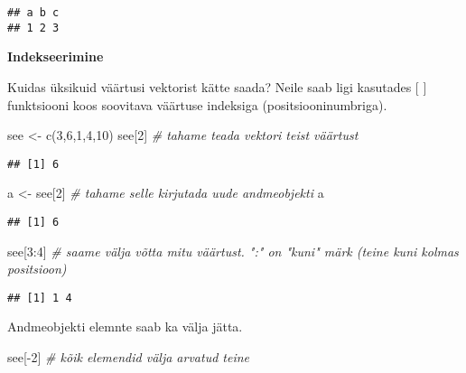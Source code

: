 \documentclass[
]{book}
\newenvironment{Shaded}{\begin{snugshade}}{\end{snugshade}}
\newcommand{\CommentTok}[1]{\textcolor[rgb]{0.56,0.35,0.01}{\textit{#1}}}
\newcommand{\DecValTok}[1]{\textcolor[rgb]{0.00,0.00,0.81}{#1}}
\newcommand{\FunctionTok}[1]{\textcolor[rgb]{0.00,0.00,0.00}{#1}}
\newcommand{\NormalTok}[1]{#1}
\newcommand{\OtherTok}[1]{\textcolor[rgb]{0.56,0.35,0.01}{#1}}
\newcommand{\SpecialCharTok}[1]{\textcolor[rgb]{0.00,0.00,0.00}{#1}}
\begin{document}
\begin{verbatim}
## a b c 
## 1 2 3
\end{verbatim}

\textbf{Indekseerimine}

Kuidas üksikuid väärtusi vektorist kätte saada? Neile saab ligi kasutades {[} {]} funktsiooni koos soovitava väärtuse indeksiga (positsiooninumbriga).

\begin{Shaded}
\begin{Highlighting}[]
\NormalTok{see }\OtherTok{\textless{}{-}} \FunctionTok{c}\NormalTok{(}\DecValTok{3}\NormalTok{,}\DecValTok{6}\NormalTok{,}\DecValTok{1}\NormalTok{,}\DecValTok{4}\NormalTok{,}\DecValTok{10}\NormalTok{)}
\NormalTok{see[}\DecValTok{2}\NormalTok{] }\CommentTok{\# tahame teada vektori teist väärtust}
\end{Highlighting}
\end{Shaded}

\begin{verbatim}
## [1] 6
\end{verbatim}

\begin{Shaded}
\begin{Highlighting}[]
\NormalTok{a }\OtherTok{\textless{}{-}}\NormalTok{ see[}\DecValTok{2}\NormalTok{] }\CommentTok{\# tahame selle kirjutada uude andmeobjekti}
\NormalTok{a}
\end{Highlighting}
\end{Shaded}

\begin{verbatim}
## [1] 6
\end{verbatim}

\begin{Shaded}
\begin{Highlighting}[]
\NormalTok{see[}\DecValTok{3}\SpecialCharTok{:}\DecValTok{4}\NormalTok{] }\CommentTok{\# saame välja võtta mitu väärtust. ":" on "kuni" märk (teine kuni kolmas positsioon)}
\end{Highlighting}
\end{Shaded}

\begin{verbatim}
## [1] 1 4
\end{verbatim}

Andmeobjekti elemnte saab ka välja jätta.

\begin{Shaded}
\begin{Highlighting}[]
\NormalTok{see[}\SpecialCharTok{{-}}\DecValTok{2}\NormalTok{] }\CommentTok{\# kõik elemendid välja arvatud teine}
\end{Highlighting}
\end{Shaded}
\end{document}
